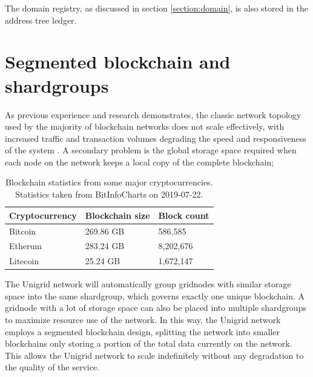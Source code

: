 \documentclass[10pt,a4paper,final]{article}
\begin{document}
\noindent The domain registry, as discussed in section \ref{section:domain}, is also stored in the address tree ledger. 

\section{Segmented blockchain and \glspl{shardgroup}}
As previous experience and research demonstrates, the classic network topology used by the majority of blockchain networks does not scale effectively, with increased traffic and transaction volumes degrading the speed and responsiveness of the system \cite{songze2018}. A secondary problem is the global storage space required when each node on the network keeps a local copy of the complete blockchain;

\begin{table}[H]
\centering
\begin{tabular}{|p{3cm}|p{3cm}|p{2.5cm}|}
	\hline
	Cryptocurrency & Blockchain size & Block count \\
	\hline
	Bitcoin & 269.86 GB & 586,585\\
	Etherum & 283.24 GB & 	8,202,676\\
	Litecoin & 25.24 GB & 1,672,147\\
	\hline
\end{tabular}
\caption{Blockchain statistics from some major cryptocurrencies. Statistics taken from BitInfoCharts \cite{bitinfocharts2019} on 2019-07-22.}
\end{table}

\noindent
The Unigrid network will automatically group \glspl{gridnode} with similar storage space into the same \gls{shardgroup}, which governs exactly one unique blockchain. A \gls{gridnode} with a lot of storage space can also be placed into multiple \glspl{shardgroup} to maximize resource use of the network. In this way, the Unigrid network employs a segmented blockchain design, splitting the network into smaller blockchains only storing a portion of the total data currently on the network. This allows the Unigrid network to scale indefinitely without any degradation to the quality of the service.
\end{document}
